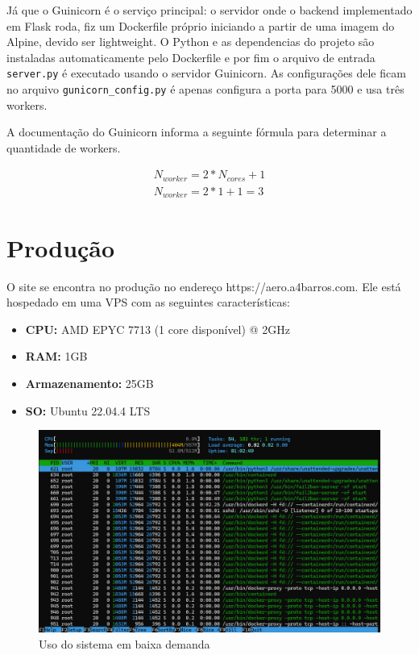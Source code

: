 Já que o Guinicorn é o serviço principal: o servidor onde o backend implementado em Flask roda,
fiz um Dockerfile próprio iniciando a partir de uma imagem do Alpine, devido ser lightweight.
O Python e as dependencias do projeto são instaladas automaticamente pelo Dockerfile e por
fim o arquivo de entrada \texttt{server.py} é executado usando o servidor Guinicorn. As configurações
dele ficam no arquivo \texttt{gunicorn\_config.py} é apenas configura a porta para 5000 e usa três workers.

A documentação do Guinicorn informa a seguinte fórmula para determinar a quantidade de workers. \cite{number-work}

\begin{equation} 
    \begin{split}
        N_{worker} = 2 * N_{cores} + 1 \\
        N_{worker} = 2 * 1 + 1 = 3 
    \end{split}
\end{equation}

\section{Produção}
O site se encontra no produção no endereço https://aero.a4barros.com. Ele está hospedado em uma VPS
com as seguintes características:

\begin{itemize}
    \item \textbf{CPU:} AMD EPYC 7713 (1 core disponível) @ 2GHz
    \item \textbf{RAM:} 1GB
    \item \textbf{Armazenamento:} 25GB
    \item \textbf{SO:} Ubuntu 22.04.4 LTS
\end{itemize}

\begin{figure}[ht]
    \begin{center}
    \includegraphics[width=400pt]{img/prod-idle.png}
    \caption{Uso do sistema em baixa demanda}
    \label{fig:prod-idle}
    \end{center}
\end{figure}


